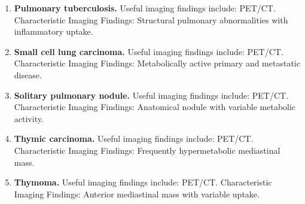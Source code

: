 \begin{enumerate}[leftmargin=*,itemsep=0.45em,topsep=0.4em]
\item \textbf{Pulmonary tuberculosis.} Useful imaging findings include: PET/CT. Characteristic Imaging Findings: Structural pulmonary abnormalities with inflammatory uptake.
\item \textbf{Small cell lung carcinoma.} Useful imaging findings include: PET/CT. Characteristic Imaging Findings: Metabolically active primary and metastatic disease.
\item \textbf{Solitary pulmonary nodule.} Useful imaging findings include: PET/CT. Characteristic Imaging Findings: Anatomical nodule with variable metabolic activity.
\item \textbf{Thymic carcinoma.} Useful imaging findings include: PET/CT. Characteristic Imaging Findings: Frequently hypermetabolic mediastinal mass.
\item \textbf{Thymoma.} Useful imaging findings include: PET/CT. Characteristic Imaging Findings: Anterior mediastinal mass with variable uptake.
\end{enumerate}

